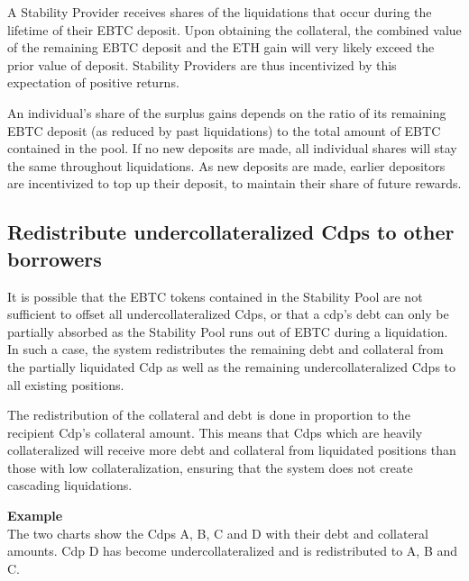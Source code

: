 \documentclass{article}
\begin{document}
A Stability Provider receives shares of the liquidations that occur during the lifetime of their EBTC deposit. Upon obtaining the collateral, the combined value of the remaining EBTC deposit and the ETH gain will very likely exceed the prior value of deposit. Stability Providers are thus incentivized by this expectation of positive returns.

An individual’s share of the surplus gains depends on the ratio of its remaining EBTC deposit (as reduced by past liquidations) to the total amount of EBTC contained in the pool. If no new deposits are made, all individual shares will stay the same throughout liquidations. As new deposits are made, earlier depositors are incentivized to top up their deposit, to maintain their share of future rewards.

\subsection{Redistribute undercollateralized Cdps to other borrowers}
It is possible that the EBTC tokens contained in the Stability Pool are not sufficient to offset all undercollateralized Cdps, or that a cdp’s debt can only be partially absorbed as the Stability Pool runs out of EBTC during a liquidation. In such a case, the system redistributes the remaining debt and collateral from the partially liquidated Cdp as well as the remaining undercollateralized Cdps to all existing positions.

The redistribution of the collateral and debt is done in proportion to the recipient Cdp’s collateral amount. This means that Cdps which are heavily collateralized will receive more debt and collateral from liquidated positions than those with low collateralization, ensuring that the system does not create cascading liquidations.\\

\begin{tcolorbox}
\textbf{Example}\\
The two charts show the Cdps A, B, C and D with their debt and collateral amounts. Cdp D has become undercollateralized and is redistributed to A, B and C.
\end{tcolorbox}
\end{document}
